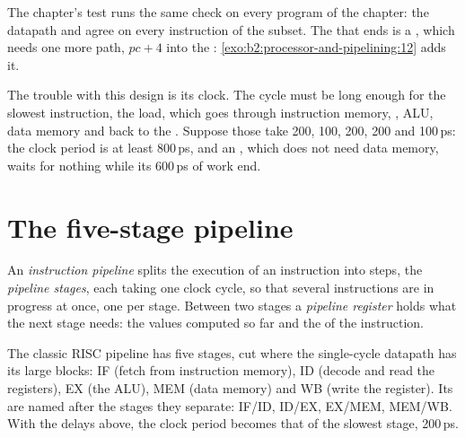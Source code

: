 \label{out:b2:processor-and-pipelining:datapath}

The chapter's test runs the same check on every program of the chapter: the datapath and  agree on every
instruction of the subset. The  that ends  is a , which needs one more path,
$\mathit{pc} + 4$ into the : \cref{exo:b2:processor-and-pipelining:12} adds it.

The trouble with this design is its clock. The cycle must be long enough for the slowest instruction, the load,
which goes through instruction memory, , ALU, data memory and back to the . Suppose those
take 200, 100, 200, 200 and 100\,ps: the clock period is at least 800\,ps, and an , which does not need data
memory, waits for nothing while its 600\,ps of work end.

\section{The five-stage pipeline}\label{sec:b2:processor-and-pipelining:pipeline}

\begin{definition}\label{def:b2:processor-and-pipelining:pipeline}
An \emph{instruction pipeline} splits the execution of an instruction into steps, the
\emph{pipeline stages}, each taking one clock cycle, so that several instructions are in
progress at once, one per stage. Between two stages a \emph{pipeline register} holds what
the next stage needs: the values computed so far and the  of the instruction.
\end{definition}

The classic RISC pipeline has five stages, cut where the single-cycle datapath has its large blocks: IF (fetch from
instruction memory), ID (decode and read the registers), EX (the ALU), MEM (data memory) and WB (write the
register). Its  are named after the stages they separate: IF/ID, ID/EX, EX/MEM, MEM/WB. With the
delays above, the clock period becomes that of the slowest stage, 200\,ps.

